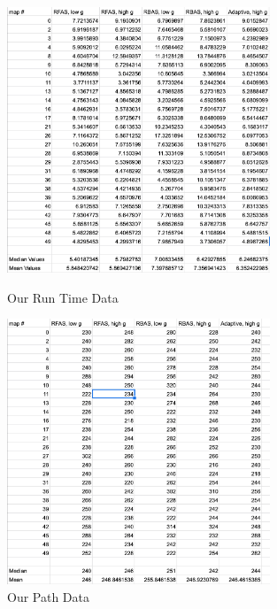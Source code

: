 \documentclass[a4paper,12pt]{article}
\begin{document}
\begin{figure}
	\includegraphics[angle=0, origin=c, width =  0.7\textwidth]{data1.jpg}
	\caption{Our Run Time Data}
	
	\vspace*{\floatsep}
	
	\includegraphics[angle=0, origin=c, width =  0.7\textwidth]{data2.jpg}
	\caption{Our Path Data}
\end{figure}
\end{document}
